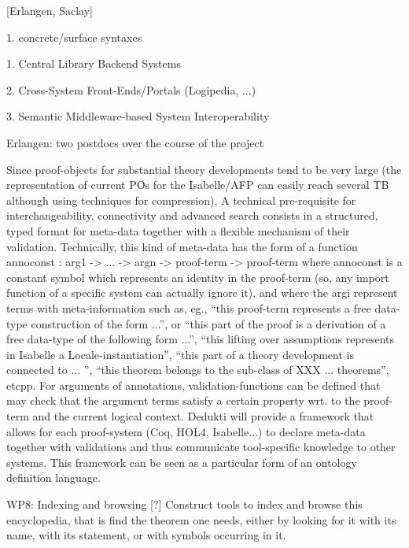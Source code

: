 [Erlangen, Saclay]


1. concrete/surface syntaxes 

1. Central Library Backend Systems 

2. Cross-System Front-Ends/Portals (Logipedia, ...)

3. Semantic Middleware-based System Interoperability 

Erlangen: two postdocs over the course of the project

Since proof-objects for substantial theory developments tend to be
very large (the representation of current POs for the Isabelle/AFP can
easily reach several TB although using techniques for compression), A
technical pre-requisite for interchangeability, connectivity and
advanced search consists in a structured, typed format for meta-data
together with a flexible mechanism of their validation. Technically,
this kind of meta-data has the form of a function annoconst : arg1 ->
... -> argn -> proof-term -> proof-term where annoconst is a constant
symbol which represents an identity in the proof-term (so, any import
function of a specific system can actually ignore it), and where the
argi represent terms with meta-information such as, eg., “this
proof-term represents a free data-type construction of the form ...”,
or “this part of the proof is a derivation of a free data-type of the
following form ...”, “this lifting over assumptions represents in
Isabelle a Locale-instantiation”, “this part of a theory
development is connected to ... ”, “this theorem belongs to the
sub-class of XXX ... theorems”, etcpp. For arguments of annotations,
validation-functions can be defined that may check that the argument
terms satisfy a certain property wrt. to the proof-term and the
current logical context. Dedukti will provide a framework that allows
for each proof-system (Coq, HOL4, Isabelle...) to declare meta-data
together with validations and thus communicate tool-specific knowledge
to other systems. This framework can be seen as a particular form of
an ontology definition language.
 
WP8: Indexing and browsing [?]  Construct tools to index and browse
this encyclopedia, that is find the theorem one needs, either by
looking for it with its name, with its statement, or with symbols
occurring in it.
